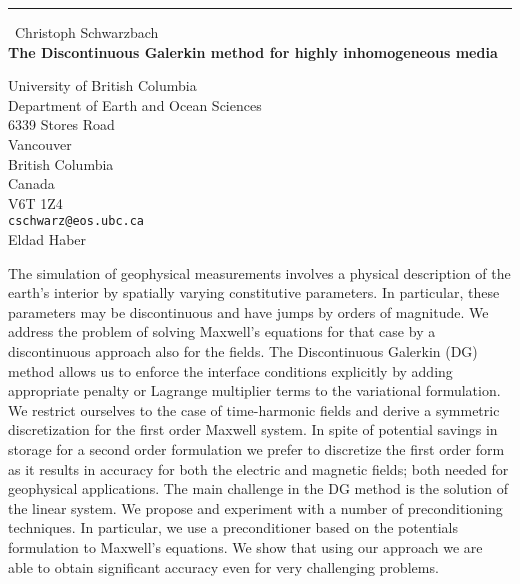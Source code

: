 \documentclass{report}
\begin{document}
\begin{center}
\rule{6in}{1pt} \
{\large Christoph Schwarzbach \\
{\bf The Discontinuous Galerkin method for highly inhomogeneous media}}

University of British Columbia \\ Department of Earth and Ocean Sciences \\ 6339 Stores Road \\ Vancouver \\ British Columbia \\ Canada \\ V6T 1Z4
\\
{\tt cschwarz@eos.ubc.ca}\\
Eldad Haber\end{center}

The simulation of geophysical measurements involves a physical
description of the earth's interior by spatially varying constitutive
parameters. In particular, these parameters may be discontinuous and have
jumps by orders of magnitude. We address the problem of solving Maxwell's
equations for that case by a discontinuous approach also for the fields.
The Discontinuous Galerkin (DG) method allows us to enforce the interface
conditions explicitly by adding appropriate penalty or Lagrange
multiplier terms to the variational formulation. We restrict ourselves to
the case of time-harmonic fields and derive a symmetric discretization
for the first order Maxwell system. In spite of potential savings in
storage for a second order formulation we prefer to discretize the first
order form as it results in accuracy for both the electric and magnetic
fields; both needed for geophysical applications. The main challenge in
the DG method is the solution of the linear system. We propose and
experiment with a number of preconditioning techniques. In particular, we
use a preconditioner based on the potentials formulation to Maxwell's
equations. We show that using our approach we are able to obtain
significant accuracy even for very challenging problems.
\end{document}

